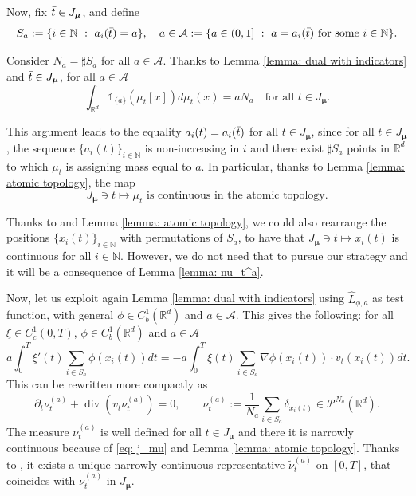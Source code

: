 \documentclass[10pt,leqno]{amsart}
\numberwithin{equation}{section}
\newcommand{\R}{\mathbb{R}}
\newcommand{\N}{\mathbb{N}}
\newcommand{\PP}{\mathcal{P}}
\begin{document}
Now, fix $\Bar{t}\in J_{\boldsymbol{\mu}}$, and define
\[S_{a}:=\{i\in \N \ : \ a_i(\Bar{t}) = a\}, \quad a \in \mathcal{A}:= \{ a \in (0,1] \ : \ a = a_i(\Bar{t}) \text{ for some } i\in \N \}.\]

\noindent Consider $N_a = \sharp S_a$ for all $a\in \mathcal{A}$. Thanks to Lemma \ref{lemma: dual with indicators} and $\Bar{t}\in J_{\boldsymbol{\mu}}$, for all $a\in \mathcal{A}$
\[\int_{\R^d} \mathds{1}_{\{a\}}(\mu_t[x]) d\mu_t(x) = a N_a \quad \text{for all }t\in J_{\boldsymbol{\mu}}.\]

This argument leads to the equality $a_i(t) = a_i(\Bar{t})$ for all $t\in J_{\boldsymbol{\mu}}$, since for all $t\in J_{\boldsymbol{\mu}}$, the sequence $\{a_i(t)\}_{i\in \N}$ is non-increasing in $i$ and there exist $\sharp S_a$ points in $\R^d$ to which $\mu_t$ is assigning mass equal to $a$. In particular, thanks to Lemma \ref{lemma: atomic topology}, the map 
\begin{equation}\label{eq: j_mu}
J_{\boldsymbol{\mu}} \ni t\mapsto \mu_t \text{ is continuous in the atomic topology}.
\end{equation}

Thanks to \cite{delellis2003regular} and Lemma \ref{lemma: atomic topology}, we could also rearrange the positions $\{x_i(t)\}_{i\in \N}$ with permutations of $S_a$, to have that $J_{\boldsymbol{\mu}}\ni t \mapsto x_i(t) $ is continuous for all $i\in \N$. However, we do not need that to pursue our strategy and it will be a consequence of Lemma \ref{lemma: nu_t^a}.









Now, let us exploit again Lemma \ref{lemma: dual with indicators} using $\hat{L}_{\phi,a}$ as test function, with general $\phi\in C_b^1(\R^d)$ and $a\in \mathcal{A}$. This gives the following: for all $\xi \in C_c^1(0,T)$, $\phi \in C_b^1(\R^d)$ and $a\in \mathcal{A}$
\begin{equation}
   a \int_0^T \xi'(t) \sum_{i\in S_a} \phi(x_i(t)) dt = - a \int_0^T \xi(t) \sum_{i\in S_a}\nabla \phi(x_i(t))\cdot  v_t(x_i(t)) dt.
\end{equation}
This can be rewritten more compactly as 
\begin{equation}
    \partial_t \nu_t^{(a)} + \operatorname{div}(v_t \nu_t^{(a)}) = 0, \qquad \nu_t^{(a)}:= \frac{1}{N_a} \sum_{i\in S_a} \delta_{x_i(t)} \in \PP^{N_a}(\R^d). 
\end{equation}
The measure $\nu_t^{(a)}$ is well defined for all $t\in J_{\boldsymbol{\mu}}$ and there it is narrowly continuous because of \eqref{eq: j_mu} and Lemma \ref{lemma: atomic topology}. Thanks to \cite[Lemma 8.1.2]{ambrosio2005gradient}, it exists a unique narrowly continuous representative $\tilde{\nu}_t^{(a)}$ on $[0,T]$, that coincides with $\nu_{t}^{(a)}$ in $J_{\boldsymbol{\mu}}$.
\end{document}
